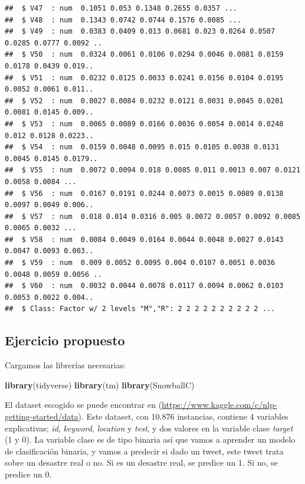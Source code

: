 \documentclass[
]{article}
\newenvironment{Shaded}{\begin{snugshade}}{\end{snugshade}}
\newcommand{\KeywordTok}[1]{\textcolor[rgb]{0.13,0.29,0.53}{\textbf{#1}}}
\newcommand{\NormalTok}[1]{#1}
\begin{document}
\begin{verbatim}
##  $ V47  : num  0.1051 0.053 0.1348 0.2655 0.0357 ...
##  $ V48  : num  0.1343 0.0742 0.0744 0.1576 0.0085 ...
##  $ V49  : num  0.0383 0.0409 0.013 0.0681 0.023 0.0264 0.0507 0.0285 0.0777 0.0092 ..
##  $ V50  : num  0.0324 0.0061 0.0106 0.0294 0.0046 0.0081 0.0159 0.0178 0.0439 0.019..
##  $ V51  : num  0.0232 0.0125 0.0033 0.0241 0.0156 0.0104 0.0195 0.0052 0.0061 0.011..
##  $ V52  : num  0.0027 0.0084 0.0232 0.0121 0.0031 0.0045 0.0201 0.0081 0.0145 0.009..
##  $ V53  : num  0.0065 0.0089 0.0166 0.0036 0.0054 0.0014 0.0248 0.012 0.0128 0.0223..
##  $ V54  : num  0.0159 0.0048 0.0095 0.015 0.0105 0.0038 0.0131 0.0045 0.0145 0.0179..
##  $ V55  : num  0.0072 0.0094 0.018 0.0085 0.011 0.0013 0.007 0.0121 0.0058 0.0084 ...
##  $ V56  : num  0.0167 0.0191 0.0244 0.0073 0.0015 0.0089 0.0138 0.0097 0.0049 0.006..
##  $ V57  : num  0.018 0.014 0.0316 0.005 0.0072 0.0057 0.0092 0.0085 0.0065 0.0032 ...
##  $ V58  : num  0.0084 0.0049 0.0164 0.0044 0.0048 0.0027 0.0143 0.0047 0.0093 0.003..
##  $ V59  : num  0.009 0.0052 0.0095 0.004 0.0107 0.0051 0.0036 0.0048 0.0059 0.0056 ..
##  $ V60  : num  0.0032 0.0044 0.0078 0.0117 0.0094 0.0062 0.0103 0.0053 0.0022 0.004..
##  $ Class: Factor w/ 2 levels "M","R": 2 2 2 2 2 2 2 2 2 2 ...
\end{verbatim}

\hypertarget{ejercicio-propuesto}{%
\subsection{Ejercicio propuesto}\label{ejercicio-propuesto}}

Cargamos las librerías necesarias:

\begin{Shaded}
\begin{Highlighting}[]
\KeywordTok{library}\NormalTok{(tidyverse)}
\KeywordTok{library}\NormalTok{(tm)}
\KeywordTok{library}\NormalTok{(SnowballC)}
\end{Highlighting}
\end{Shaded}

El dataset escogido se puede encontrar en
(\url{https://www.kaggle.com/c/nlp-getting-started/data}). Este dataset,
con 10.876 instancias, contiene 4 variables explicativas; \emph{id},
\emph{keyword}, \emph{location} y \emph{test}, y dos valores en la
variable clase \emph{target} (1 y 0). La variable clase es de tipo
binaria así que vamos a aprender un modelo de clasificación binaria, y
vamos a predecir si dado un tweet, este tweet trata sobre un desastre
real o no. Si es un desastre real, se predice un 1. Si no, se predice un
0.
\end{document}
